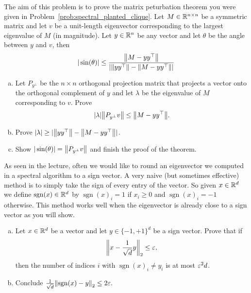 \begin{myexercise}
    \label{prob:baby_davis_kahan}
    The aim of this problem is to prove the matrix peturbation theorem you were given in Problem~\ref{prob:spectral_planted_clique}. Let $M \in \mathbb{R}^{n \times n}$ be a symmetric matrix and let $v$ be a unit-length eigenvector corresponding to the largest eigenvalue of $M$ (in magnitude). Let $y \in \mathbb{R}^n$ be any vector and let $\theta$ be the angle between $y$ and $v$, then
    $$ |\sin(\theta)| \leq \frac{{\left\lVert{M-  yy^\top}\right\rVert}}{|{\left\lVert{yy^\top}\right\rVert} - {\left\lVert{M-  yy^\top}\right\rVert}|}$$
     \begin{enumerate}[(a)]
        \item Let $P_{y^\perp}$ be the $n \times n$ orthogonal projection matrix that projects a vector onto the orthogonal complement of $y$ and let $\lambda$ be the eigenvalue of $M$ corresponding to $v$. Prove
        $$ |\lambda| {\left\lVert{P_{y^\perp}v }\right\rVert} \leq {\left\lVert{M-yy^\top}\right\rVert}. $$
        \item Prove $|\lambda| \geq |{\left\lVert{yy^\top}\right\rVert} - {\left\lVert{M-  yy^\top}\right\rVert}|$.
        \item Show $|\sin(\theta)| =  {\left\lVert{P_{y^\perp}v }\right\rVert} $ and finish the proof of the theorem.
    \end{enumerate}
    
\end{myexercise}



\begin{myexercise}
    \label{prob:sign_rounding}
    As seen in the lecture, often we would like to round an eigenvector we computed in a spectral algorithm to a sign vector. A very naive (but sometimes effective) method is to simply take the sign of every entry of the vector. So given $x \in \mathbb{R}^d$ we define $\operatorname{sgn}(x) \in \mathbb{R}^d$ by $\operatorname{sgn}(x)_i = 1$ if $x_i \geq 0$ and $\operatorname{sgn}(x)_i = -1$ otherwise. This method works well when the eigenvector is already close to a sign vector as you will show.
     \begin{enumerate}[(a)]
        \item Let $x \in \mathbb{R}^d$ be a vector and let $y \in \{-1,+1\}^d$ be a sign vector. Prove that if 
        $$ {\left\lVert{x-\frac{1}{\sqrt{d}}y}\right\rVert}_2 \leq \varepsilon,$$
        then the number of indices $i$ with $\operatorname{sgn}(x)_i \neq y_i$ is at most $\varepsilon^2 d$.
        \item Conclude $ \frac{1}{\sqrt{d}}{\left\lVert{\operatorname{sgn}(x)-y}\right\rVert}_2 \leq 2\varepsilon.$
    \end{enumerate}
    
\end{myexercise}





